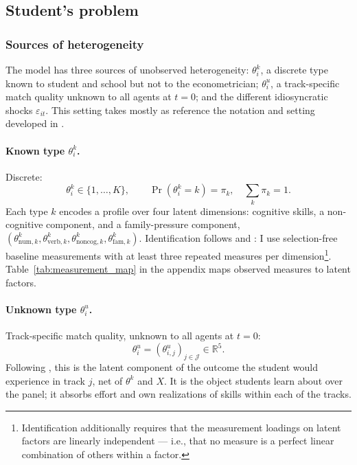 \documentclass{article}
\begin{document}
\subsection{Student's problem}

\subsubsection{Sources of heterogeneity}

The model has three sources of unobserved heterogeneity: $\theta^k_i$, a discrete type known to student and school but not to the econometrician; $\theta^u_i$, a track-specific match quality unknown to all agents at $t=0$; and the different idiosyncratic shocks $\varepsilon_{it}$. This setting takes mostly as reference the notation and setting developed in \citet{arcidiacono2025college, bunting2024heterogeneity}.

\paragraph{Known type $\theta^k_i$.} Discrete:
\begin{equation}
  \theta^k_i \in \{1, \ldots, K\}, \qquad \Pr(\theta^k_i = k) = \pi_k, \quad \sum_k \pi_k = 1.
  \label{eq:thetak}
\end{equation}
Each type $k$ encodes a profile over four latent dimensions: cognitive skills, a non-cognitive component, and a family-pressure component, $(\theta^k_{\mathrm{num},k}, \theta^k_{\mathrm{verb},k}, \theta^k_{\mathrm{noncog},k}, \theta^k_{\mathrm{fam},k})$. Identification follows \citet{humphries_joensen_veramendi_2025_complementarities} and \citet{arcidiacono2025college}: I use selection-free baseline measurements with at least three repeated measures per dimension\footnote{Identification additionally requires that the measurement loadings on latent factors are linearly independent — i.e., that no measure is a perfect linear combination of others within a factor.}. Table~\ref{tab:measurement_map} in the appendix maps observed measures to latent factors.

\paragraph{Unknown type $\theta^u_i$.} Track-specific match quality, unknown to all agents at $t=0$:
\begin{equation}
  \theta^u_i = (\theta^u_{i,j})_{j \in \mathcal{J}} \in \mathbb{R}^{5}.
  \label{eq:thetau}
\end{equation}
Following \citet{arcidiacono2025college}, this is the latent component of the outcome the student would experience in track $j$, net of $\theta^k$ and $X$. It is the object students learn about over the panel; it absorbs effort and own realizations of skills within each of the tracks. 
\end{document}
